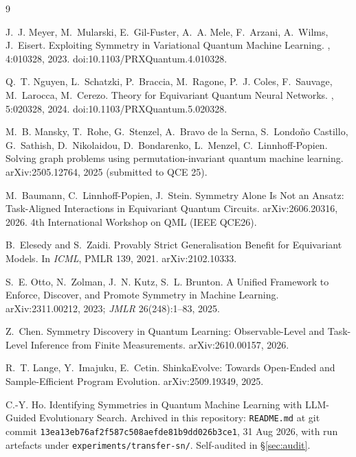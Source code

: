 \documentclass[11pt]{article}
\begin{document}
\begin{small}

\begin{thebibliography}{9}

 J.~J. Meyer, M.~Mularski, E.~Gil-Fuster, A.~A. Mele, F.~Arzani,
A.~Wilms, J.~Eisert.
\newblock Exploiting Symmetry in Variational Quantum Machine Learning.
, 4:010328, 2023. doi:10.1103/PRXQuantum.4.010328.

 Q.~T. Nguyen, L.~Schatzki, P.~Braccia, M.~Ragone, P.~J. Coles,
F.~Sauvage, M.~Larocca, M.~Cerezo.
\newblock Theory for Equivariant Quantum Neural Networks.
, 5:020328, 2024. doi:10.1103/PRXQuantum.5.020328.

 M.~B. Mansky, T.~Rohe, G.~Stenzel, A.~Bravo de la Serna,
S.~Londo\~no Castillo, G.~Sathish, D.~Nikolaidou, D.~Bondarenko, L.~Menzel,
C.~Linnhoff-Popien.
\newblock Solving graph problems using permutation-invariant quantum machine learning.
\newblock arXiv:2505.12764, 2025 (submitted to QCE 25).

 M.~Baumann, C.~Linnhoff-Popien, J.~Stein.
\newblock Symmetry Alone Is Not an Ansatz: Task-Aligned Interactions in Equivariant
Quantum Circuits.
\newblock arXiv:2606.20316, 2026. 4th International Workshop on QML (IEEE QCE26).

 B.~Elesedy and S.~Zaidi.
\newblock Provably Strict Generalisation Benefit for Equivariant Models.
\newblock In {\em ICML}, PMLR 139, 2021. arXiv:2102.10333.

 S.~E. Otto, N.~Zolman, J.~N. Kutz, S.~L. Brunton.
\newblock A Unified Framework to Enforce, Discover, and Promote Symmetry in Machine
Learning.
\newblock arXiv:2311.00212, 2023; {\em JMLR} 26(248):1--83, 2025.

 Z.~Chen.
\newblock Symmetry Discovery in Quantum Learning: Observable-Level and Task-Level
Inference from Finite Measurements.
\newblock arXiv:2610.00157, 2026.

 R.~T. Lange, Y.~Imajuku, E.~Cetin.
\newblock ShinkaEvolve: Towards Open-Ended and Sample-Efficient Program Evolution.
\newblock arXiv:2509.19349, 2025.

 C.-Y. Ho.
\newblock Identifying Symmetries in Quantum Machine Learning with LLM-Guided Evolutionary
Search.
\newblock Archived in this repository: \texttt{README.md} at git commit
\texttt{13ea13eb76af2f587c508aefde81b9dd026b3ce1}, 31 Aug 2026, with run artefacts under
\texttt{experiments/transfer-sn/}. Self-audited in \S\ref{sec:audit}.

\end{thebibliography}
\end{small}
\end{document}
